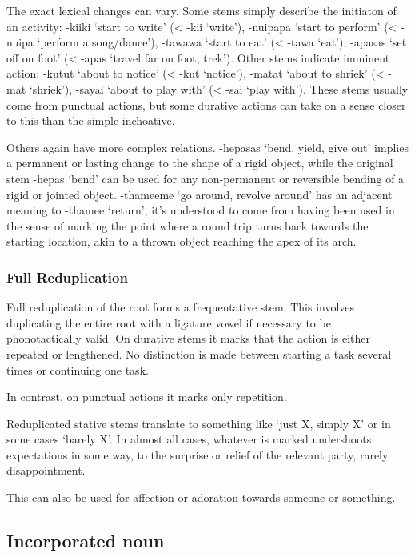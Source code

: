 \documentclass[smallroyalvopaper,9pt]{memoir} %
\begin{document}
The exact lexical changes can vary. Some stems simply describe the initiaton of an activity: -kiiki `start to write' (< -kii `write'), -nuipapa `start to perform' (< -nuipa `perform a song/dance'), -tawawa `start to eat' (< -tawa `eat'), -apasas `set off on foot' (< -apas `travel far on foot, trek'). Other stems indicate imminent action: -kutut `about to notice' (< -kut `notice'), -matat `about to shriek' (< -mat `shriek'), -sayai `about to play with' (< -sai `play with'). These stems usually come from punctual actions, but some durative actions can take on a sense closer to this than the simple inchoative.

Others again have more complex relations. -hepasas `bend, yield, give out' implies a permanent or lasting change to the shape of a rigid object, while the original stem -hepas `bend' can be used for any non-permanent or reversible bending of a rigid or jointed object. -thameeme `go around, revolve around' has an adjacent meaning to -thamee `return'; it's understood to come from having been used in the sense of marking the point where a round trip turns back towards the starting location, akin to a thrown object reaching the apex of its arch.

\subsubsection{Full Reduplication}

Full reduplication of the root forms a frequentative stem. This involves duplicating the entire root with a ligature vowel if necessary to be phonotactically valid. On durative stems it marks that the action is either repeated or lengthened. No distinction is made between starting a task several times or continuing one task.


In contrast, on punctual actions it marks only repetition. 


Reduplicated stative stems translate to something like `just X, simply X' or in some cases `barely X'. In almost all cases, whatever is marked undershoots expectations in some way, to the surprise or relief of the relevant party, rarely disappointment.


This can also be used for affection or adoration towards someone or something.


\subsection{Incorporated noun}
\end{document}
